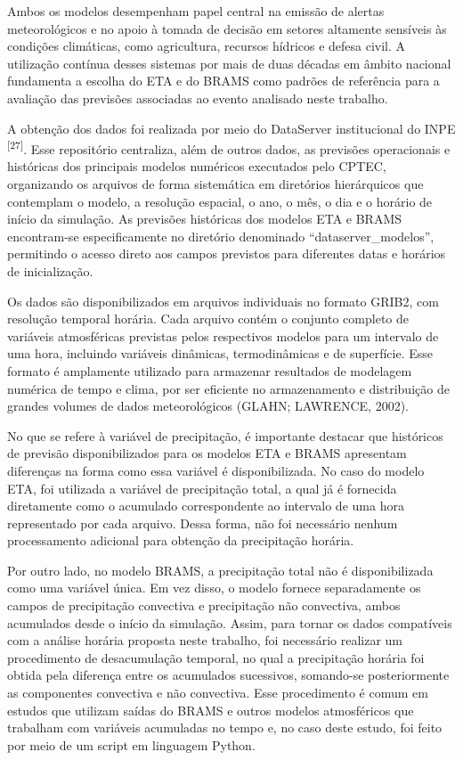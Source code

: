 \documentclass[12pt,a4paper,oneside]{book}
\begin{document}
Ambos os modelos desempenham papel central na emissão de alertas meteorológicos e no apoio à tomada de decisão em setores altamente sensíveis às condições climáticas, como agricultura, recursos hídricos e defesa civil. A utilização contínua desses sistemas por mais de duas décadas em âmbito nacional fundamenta a escolha do ETA e do BRAMS como padrões de referência para a avaliação das previsões associadas ao evento analisado neste trabalho.

A obtenção dos dados foi realizada por meio do DataServer institucional do INPE \textsuperscript{{[}27{]}}. Esse repositório centraliza, além de outros dados, as previsões operacionais e históricas dos principais modelos numéricos executados pelo CPTEC, organizando os arquivos de forma sistemática em diretórios hierárquicos que contemplam o modelo, a resolução espacial, o ano, o mês, o dia e o horário de início da simulação. As previsões históricas dos modelos ETA e BRAMS encontram-se especificamente no diretório denominado ``dataserver\_modelos'', permitindo o acesso direto aos campos previstos para diferentes datas e horários de inicialização.

Os dados são disponibilizados em arquivos individuais no formato GRIB2, com resolução temporal horária. Cada arquivo contém o conjunto completo de variáveis atmosféricas previstas pelos respectivos modelos para um intervalo de uma hora, incluindo variáveis dinâmicas, termodinâmicas e de superfície. Esse formato é amplamente utilizado para armazenar resultados de modelagem numérica de tempo e clima, por ser eficiente no armazenamento e distribuição de grandes volumes de dados meteorológicos (GLAHN; LAWRENCE, 2002).

No que se refere à variável de precipitação, é importante destacar que históricos de previsão disponibilizados para os modelos ETA e BRAMS apresentam diferenças na forma como essa variável é disponibilizada. No caso do modelo ETA, foi utilizada a variável de precipitação total, a qual já é fornecida diretamente como o acumulado correspondente ao intervalo de uma hora representado por cada arquivo. Dessa forma, não foi necessário nenhum processamento adicional para obtenção da precipitação horária.

Por outro lado, no modelo BRAMS, a precipitação total não é disponibilizada como uma variável única. Em vez disso, o modelo fornece separadamente os campos de precipitação convectiva e precipitação não convectiva, ambos acumulados desde o início da simulação. Assim, para tornar os dados compatíveis com a análise horária proposta neste trabalho, foi necessário realizar um procedimento de desacumulação temporal, no qual a precipitação horária foi obtida pela diferença entre os acumulados sucessivos, somando-se posteriormente as componentes convectiva e não convectiva. Esse procedimento é comum em estudos que utilizam saídas do BRAMS e outros modelos atmosféricos que trabalham com variáveis acumuladas no tempo e, no caso deste estudo, foi feito por meio de um script em linguagem Python.
\end{document}
